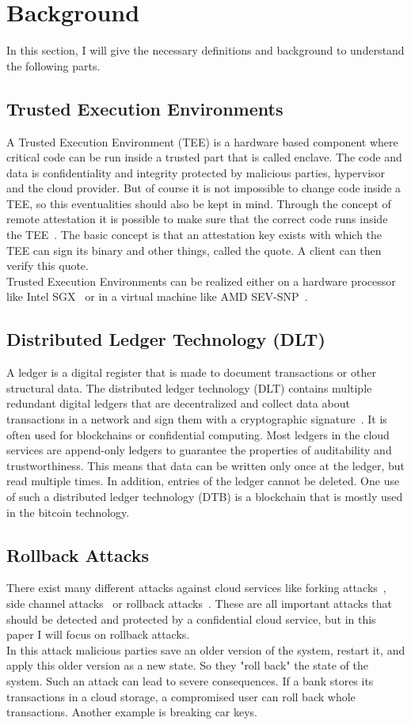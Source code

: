 \section{Background}
In this section, I will give the necessary definitions and background to understand the following parts. 
\subsection{Trusted Execution Environments}
A Trusted Execution Environment (TEE) is a hardware based component where critical code can be run inside a trusted part that is called enclave. The code and data is confidentiality and integrity protected by malicious parties, hypervisor and the cloud provider.  But of course it is not impossible to change code inside a TEE, so this eventualities should also be kept in mind. Through the concept of remote attestation it is possible to make sure that the correct code runs inside the TEE~\cite{remoteAttestation}.  The basic concept is that an attestation key exists with which the TEE can sign its binary and other things, called the quote. A client can then verify this quote. \\ %
Trusted Execution Environments can be realized either on a hardware processor like Intel SGX~\cite{sgx} or in a virtual machine like AMD SEV-SNP~\cite{amd}.%
\subsection{Distributed Ledger Technology (DLT)}
A ledger is a digital register that is made to document transactions or other structural data. The distributed ledger technology (DLT) contains multiple redundant digital ledgers that are decentralized and collect data about transactions in a network and sign them with a cryptographic signature~\cite{ledger}. It is often used for blockchains or confidential computing. Most ledgers in the cloud services are append-only ledgers to guarantee the properties of auditability and trustworthiness. This means that data can be written only once at the ledger, but read multiple times. In addition, entries of the ledger cannot be deleted. One use of such a distributed ledger technology (DTB) is a blockchain that is mostly used in the bitcoin technology.
\subsection{Rollback Attacks}
There exist many different attacks against cloud services like forking attacks~\cite{forkingAttacks}, side channel attacks~\cite{sideChannel} or rollback attacks~\cite{Rollback}. These are all important attacks that should be detected and protected by a confidential cloud service, but in this paper I will focus on rollback attacks.\\
In this attack malicious parties save an older version of the system, restart it, and apply this older version as a new state. So they "roll back" the state of the system. Such an attack can lead to severe consequences. If a bank stores its transactions in a cloud storage, a compromised user can roll back whole transactions. Another example is breaking car keys. %